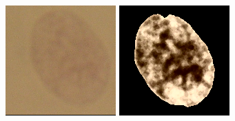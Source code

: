 \begin{figure}[t!]
	\includegraphics[width=0.95\linewidth]{Figures/Chapter2/7b1.png}
	\includegraphics[width=0.95\linewidth]{Figures/Chapter2/7b2.png}
	\endminipage\hfill
	\centering	

\end{figure}

